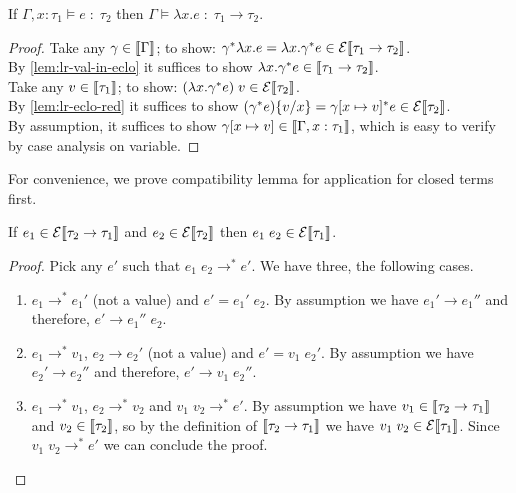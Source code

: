 \begin{lemma}
  If $\Gamma, x:\tau_1 \models e \;:\; \tau_2$
  then $\Gamma \models \lambda x.e \;:\; \tau_1 \to \tau_2$.
\end{lemma}
\begin{proof}
  Take any $\gamma \in \llbracket\Gamma\rrbracket$;
    to show: $\gamma^{*}\lambda x.e
      = \lambda x.\gamma^{*} e
      \in \mathcal{E}\llbracket\tau_1 \to \tau_2\rrbracket$.\\
  By \autoref{lem:lr-val-in-eclo} it suffices to show 
    $\lambda x.\gamma^{*} e
      \in \llbracket\tau_1 \to \tau_2\rrbracket$.\\
  Take any $v \in \llbracket\tau_1\rrbracket$;
    to show: $(\lambda x.\gamma^{*} e)\;v
      \in \mathcal{E}\llbracket\tau_2\rrbracket$. \\
  By \autoref{lem:lr-eclo-red} it suffices to show
    $(\gamma^{*} e)\{v/x\}
    = \gamma[x\mapsto v]^* e \in \mathcal{E}\llbracket\tau_2\rrbracket$. \\
  By assumption, it suffices to show
    $\gamma[x\mapsto v] \in \llbracket\Gamma, x : \tau_1\rrbracket$,
  which is easy to verify by case analysis on variable.
\end{proof}

For convenience, we prove compatibility lemma for application
for closed terms first.

\begin{lemma}\label{lem:lr-compat-app-cl}
  If $e_1 \in \mathcal{E}\llbracket\tau_2 \to \tau_1\rrbracket$
  and $e_2 \in \mathcal{E}\llbracket\tau_2\rrbracket$
  then $e_1\;e_2 \in \mathcal{E}\llbracket\tau_1\rrbracket$.
\end{lemma}
\begin{proof}
  Pick any $e'$ such that $e_1\;e_2 \longrightarrow^* e'$.
  We have three, the following cases.
  \begin{enumerate}[label=(\roman*)]
  \item $e_1 \longrightarrow^* e_1'$ (not a value) and $e' = e_1'\;e_2$.
    By assumption we have $e_1' \longrightarrow e_1''$
    and therefore, $e' \longrightarrow e_1''\;e_2$.
  \item $e_1 \longrightarrow^* v_1$, $e_2\longrightarrow e_2'$
    (not a value) and $e' = v_1\;e_2'$.
    By assumption we have $e_2' \longrightarrow e_2''$
    and therefore, $e' \longrightarrow v_1\;e_2''$.
  \item $e_1 \longrightarrow^* v_1$, $e_2 \longrightarrow^* v_2$
    and $v_1\;v_2 \longrightarrow^* e'$.
    By assumption we have $v_1\in\llbracket\tau_2\to\tau_1\rrbracket$
    and $v_2\in\llbracket\tau_2\rrbracket$,
    so by the definition of $\llbracket\tau_2\to\tau_1\rrbracket$
    we have $v_1\;v_2 \in \mathcal{E}\llbracket\tau_1\rrbracket$.
    Since $v_1\;v_2 \longrightarrow^* e'$ we can conclude the proof.
    \qedhere
  \end{enumerate}
\end{proof}

